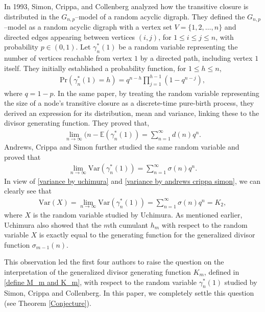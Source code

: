 \documentclass[11pt,reqno]{amsart}
\renewcommand{\(}{\left\(}
\renewcommand{\)}{\right\)}
\renewcommand{\[}{\left\[}
\renewcommand{\]}{\right\]}
\numberwithin{equation}{section}
\theoremstyle{plain}
\begin{document}
In 1993, Simon, Crippa, and Collenberg \cite{SCC1993} analyzed how the transitive closure is distributed in the $G_{n,p} $--model of a random acyclic digraph. They defined the $G_{n,p}$--model as a random acyclic digraph with a vertex set $ V = \{1, 2, \dots, n\} $ and directed edges appearing between vertices $ (i, j) $, for $ 1 \leq i \leq j \leq n $, with probability $ p \in (0, 1) $. Let $ \gamma^*_n(1) $ be a random variable representing the number of vertices reachable from vertex $1$ by a directed path, including vertex $1$ itself. They initially established a probability function, for $1 \leq h \leq n$,
\begin{align}\label{probability function define by Simon, Crippa, and Collenberg}
\mathrm{Pr}(\gamma^*_n(1)=h)=q^{n-h}\prod_{j=1}^{h-1}(1-q^{n-j}),
\end{align}
where $q=1-p$. In the same paper, by treating the random variable representing the size of a node's transitive closure as a discrete-time pure-birth process, they derived an expression for its distribution, mean and variance, linking these to the divisor generating function. They proved that,   
\begin{align}\label{expectation formula given by Simon, Crippa, and Collenberg}
\lim_{n\rightarrow \infty}(n-\mathbb{E}(\gamma^*_n(1))=\sum_{n=1}^\infty d(n) q^n.  
\end{align}
 Andrews, Crippa and Simon \cite{andrewssiam1997} further studied the same random variable and   proved that
\begin{align}\label{variance by andrews crippa simon}
\lim_{n\rightarrow \infty} \mathrm{Var}(\gamma^*_n(1))=\sum_{n=1}^\infty \sigma(n)q^n.  
\end{align}
In view of \eqref{variance by uchimura} and \eqref{variance by andrews crippa simon},  we can clearly see that 
\begin{align*}
\mathrm{Var}(X)=\lim_{n\rightarrow \infty} \mathrm{Var}(\gamma^*_n(1)) = \sum_{n=1}^\infty \sigma(n)q^n =K_2,  
\end{align*}
where $X$ is the random variable studied by Uchimura.   As mentioned earlier,  Uchimura also showed that  the $m$th cumulant $h_m$ with respect to the random variable $X$ is exactly equal to the generating function  for the  generalized divisor function $\sigma_{m-1}(n)$. 

This observation led the first four authors \cite[p.~31,  Problem 2]{ABEM24} to raise the question on the interpretation of the generalized divisor generating function $K_m$,  defined in \eqref{define M_m and K_m},   with respect to the random variable $\gamma^*_n(1)$ studied by Simon, Crippa and Collenberg.   In this paper, we  completely settle this question (see Theorem \ref{Conjecture}).  
\end{document}
